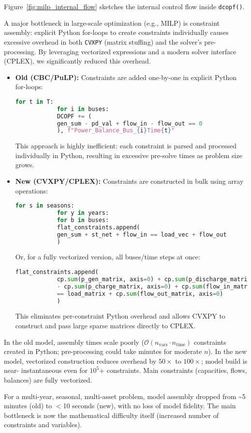 Figure~\ref{fig:milp_internal_flow} sketches the internal control
flow inside \texttt{dcopf()}. 

A major bottleneck in large-scale optimization (e.g., MILP) is constraint assembly: explicit Python for-loops 
to create constraints individually causes excessive overhead in both \texttt{CVXPY} (matrix stuffing) and the 
solver’s pre-processing. By leveraging vectorized expressions and a modern solver interface (CPLEX), we significantly 
reduced this overhead.

\begin{itemize}
\item \textbf{Old (CBC/PuLP):} Constraints are added one-by-one in explicit Python for-loops:
      \begin{lstlisting}[language=Python]
            for t in T:
            for i in buses:
            DCOPF += (
            gen_sum - pd_val + flow_in - flow_out == 0
            ), f"Power_Balance_Bus_{i}Time{t}"
      \end{lstlisting}
      This approach is highly inefficient: each constraint is parsed and processed individually in Python, resulting in excessive pre-solve times as problem size grows.
\item \textbf{New (CVXPY/CPLEX):} Constraints are constructed in bulk using array operations:
      \begin{lstlisting}[language=Python]
            for s in seasons:
            for y in years:
            for b in buses:
            flat_constraints.append(
            gen_sum + st_net + flow_in == load_vec + flow_out
            )
      \end{lstlisting}
      Or, for a fully vectorized version, all buses/time steps at once:
      \begin{lstlisting}[language=Python]
            flat_constraints.append(
            cp.sum(p_gen_matrix, axis=0) + cp.sum(p_discharge_matrix, axis=0)
            - cp.sum(p_charge_matrix, axis=0) + cp.sum(flow_in_matrix, axis=0)
            == load_matrix + cp.sum(flow_out_matrix, axis=0)
            )
      \end{lstlisting}
This eliminates per-constraint Python overhead and allows CVXPY to construct and pass large sparse matrices directly to CPLEX.
\end{itemize}

In the old model, assembly times scale poorly ($\mathcal{O}(n_{\text{vars}} \cdot n_{\text{time}})$ constraints 
created in Python; pre-processing could take minutes for moderate $n$).
In the new model, vectorized construction reduces overhead by $50\times$ to $100\times$; model build is near-
instantaneous even for $10^5$+ constraints. Main constraints (capacities, flows, balances) are fully vectorized.

For a multi-year, seasonal, multi-asset problem, model assembly dropped from \textasciitilde 5 minutes (old) 
to $<$10 seconds (new), with no loss of model fidelity. The main bottleneck is now the mathematical difficulty
itself (increased number of constraints and variables).